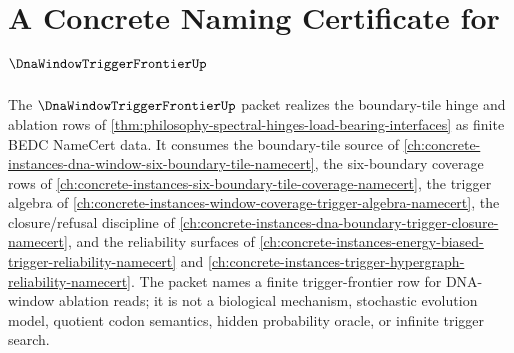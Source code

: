 \chapter{A Concrete Naming Certificate for $\DnaWindowTriggerFrontierUp$}
\label{ch:concrete-instances-dna-window-trigger-frontier-namecert}

The $\DnaWindowTriggerFrontierUp$ packet realizes the boundary-tile hinge and ablation rows of \autoref{thm:philosophy-spectral-hinges-load-bearing-interfaces} as finite BEDC NameCert data. It consumes the boundary-tile source of \autoref{ch:concrete-instances-dna-window-six-boundary-tile-namecert}, the six-boundary coverage rows of \autoref{ch:concrete-instances-six-boundary-tile-coverage-namecert}, the trigger algebra of \autoref{ch:concrete-instances-window-coverage-trigger-algebra-namecert}, the closure/refusal discipline of \autoref{ch:concrete-instances-dna-boundary-trigger-closure-namecert}, and the reliability surfaces of \autoref{ch:concrete-instances-energy-biased-trigger-reliability-namecert} and \autoref{ch:concrete-instances-trigger-hypergraph-reliability-namecert}. The packet names a finite trigger-frontier row for DNA-window ablation reads; it is not a biological mechanism, stochastic evolution model, quotient codon semantics, hidden probability oracle, or infinite trigger search.

